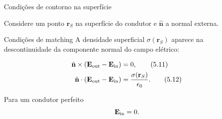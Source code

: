 \documentclass[aspectratio=169]{beamer}
\begin{document}
\begin{frame}{Condições de contorno na superfície}

\small

Considere um ponto \(\mathbf r_S\) na superfície do condutor e
\(\hat{\mathbf n}\) a normal externa.

\begin{mybox}{Condições de matching}
A densidade superficial \(\sigma(\mathbf r_S)\) aparece na descontinuidade da
componente normal do campo elétrico:
\end{mybox}

\begin{eqbox}
\begin{align}
\hat{\mathbf n}\times
\left(
\mathbf E_{\rm out}-\mathbf E_{\rm in}
\right)
&=0,
\tag{5.11}
\label{eq:matching-tangencial-condutor}
\\
\hat{\mathbf n}\cdot
\left(
\mathbf E_{\rm out}-\mathbf E_{\rm in}
\right)
&=
\frac{\sigma(\mathbf r_S)}{\epsilon_0}.
\tag{5.12}
\label{eq:matching-normal-condutor}
\end{align}
\end{eqbox}

\begin{alertblock}{Para um condutor perfeito}
\[
\mathbf E_{\rm in}=0.
\]
\end{alertblock}

\end{frame}
\end{document}
